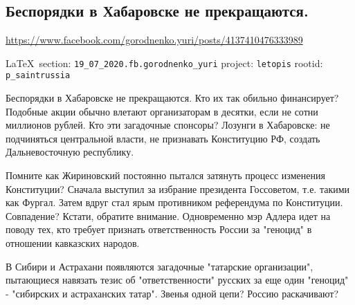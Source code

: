  
 

\subsection{Беспорядки в Хабаровске не прекращаются.}
\url{https://www.facebook.com/gorodnenko.yuri/posts/4137410476333989}
  
\vspace{0.5cm}
{\small\LaTeX~section: \verb|19_07_2020.fb.gorodnenko_yuri| project: \verb|letopis| rootid: \verb|p_saintrussia|}
\vspace{0.5cm}

Беспорядки в Хабаровске не прекращаются. Кто их так обильно финансирует?
Подобные акции обычно влетают организаторам в десятки, если не сотни миллионов
рублей. Кто эти загадочные спонсоры?  Лозунги в Хабаровске: не подчиняться
центральной власти, не признавать Конституцию РФ, создать Дальневосточную
республику.

Помните как Жириновский постоянно пытался затянуть процесс изменения
Конституции? Сначала выступил за избрание президента Госсоветом, т.е. такими
как Фургал.  Затем вдруг стал ярым противником референдума по Конституции.
Совпадение?  Кстати, обратите внимание. Одновременно мэр Адлера идет на поводу
тех, кто требует признать ответственность России за "геноцид" в отношении
кавказских народов.

В Сибири и Астрахани появляются загадочные "татарские организации", пытающиеся
навязать тезис об "ответственности" русских за еще один "геноцид" - "сибирских
и астраханских татар".  Звенья одной цепи? Россию раскачивают?
  
